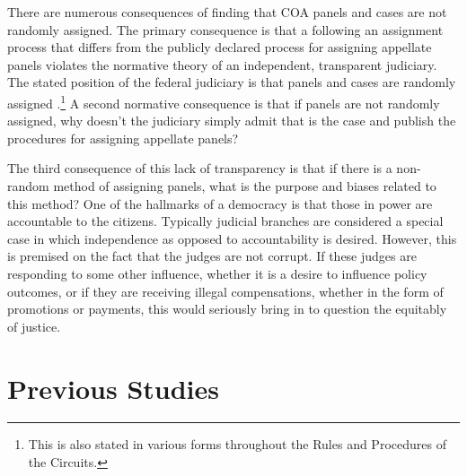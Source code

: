 \documentclass[12pt]{article}
\begin{document}
There are numerous consequences of finding that COA panels and cases are not randomly assigned.  The primary consequence is that a following an assignment process that differs from the publicly declared process for assigning appellate panels violates the normative theory of an independent, transparent judiciary.  The stated position of the federal judiciary is that panels and cases are randomly assigned \citep{Journalist2011}.\footnote{This is also stated in various forms throughout the Rules and Procedures of the Circuits.}  A second normative consequence is that if panels are not randomly assigned, why doesn't the judiciary simply admit that is the case and publish the procedures for assigning appellate panels?  

The third consequence of this lack of transparency is that if there is a non-random method of assigning panels, what is the purpose and biases related to this method?  One of the hallmarks of a democracy is that those in power are accountable to the citizens.  Typically judicial branches are considered a special case in which independence as opposed to accountability is desired.  However, this is premised on the fact that the judges are not corrupt.  If these judges are responding to some other influence, whether it is a desire to influence policy outcomes, or if they are receiving illegal compensations, whether in the form of promotions or payments, this would seriously bring in to question the equitably of justice. 

\section{Previous Studies}\label{Previous}
\end{document}
